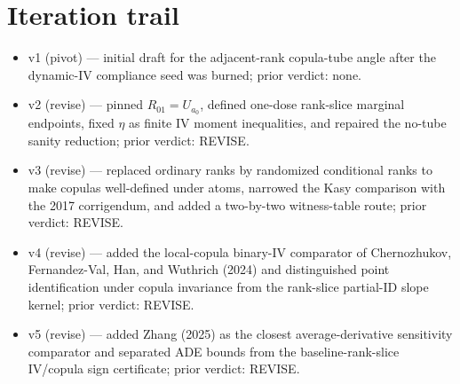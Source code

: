 \documentclass[11pt]{article}
\theoremstyle{definition}
\theoremstyle{plain}
\theoremstyle{remark}
\begin{document}
\section{Iteration trail}
\begin{itemize}[leftmargin=*]
\item v1 (pivot) --- initial draft for the adjacent-rank copula-tube angle after the dynamic-IV compliance seed was burned; prior verdict: none.
\item v2 (revise) --- pinned \(R_{01}=U_{a_0}\), defined one-dose rank-slice marginal endpoints, fixed \(\eta\) as finite IV moment inequalities, and repaired the no-tube sanity reduction; prior verdict: REVISE.
\item v3 (revise) --- replaced ordinary ranks by randomized conditional ranks to make copulas well-defined under atoms, narrowed the Kasy comparison with the 2017 corrigendum, and added a two-by-two witness-table route; prior verdict: REVISE.
\item v4 (revise) --- added the local-copula binary-IV comparator of Chernozhukov, Fernandez-Val, Han, and Wuthrich (2024) and distinguished point identification under copula invariance from the rank-slice partial-ID slope kernel; prior verdict: REVISE.
\item v5 (revise) --- added Zhang (2025) as the closest average-derivative sensitivity comparator and separated ADE bounds from the baseline-rank-slice IV/copula sign certificate; prior verdict: REVISE.
\end{itemize}
\end{document}
